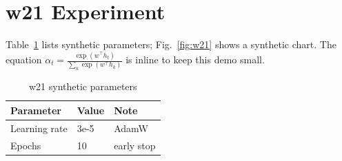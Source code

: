\documentclass[conference]{IEEEtran}
\begin{document}
%






\section{w21 Experiment}\label{sec:w21-exp}

Table~\ref{tab:w21} lists synthetic parameters; Fig.~\ref{fig:w21}
shows a synthetic chart. The equation $\alpha_{t}=\frac{\exp(w^{\top}h_{t})}
{\sum_{k}\exp(w^{\top}h_{k})}$ is inline to keep this demo small.

\begin{table}[!t]
\caption{w21 synthetic parameters}\label{tab:w21}
\centering
\begin{tabular}{|l|l|l|}
\hline
Parameter & Value & Note\\
\hline
Learning rate & 3e-5 & AdamW\\
Epochs & 10 & early stop\\
\hline
\end{tabular}
\end{table}
\end{document}
